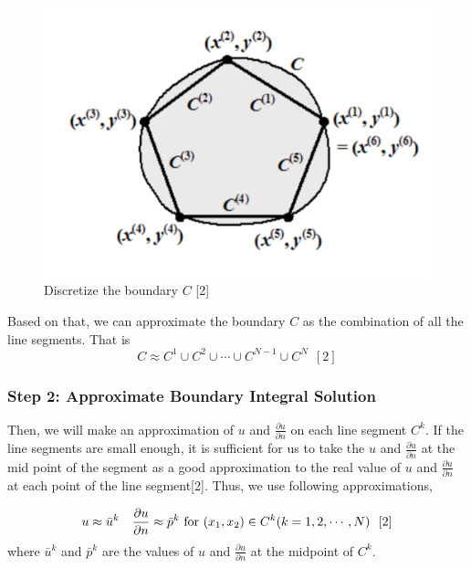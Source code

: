 \documentclass[a4paper,12pt]{article}
\begin{document}
\begin{figure}[H]
 \centering
 \includegraphics[scale=0.5]{2.png}
 \caption{Discretize the boundary $C$ [2]}
 \end{figure}
  
Based on that, we can approximate the boundary $C$ as the combination of all the line segments. That is
\begin{equation}
C \approx C^1 \cup C^2 \cup \cdots \cup C^{N-1} \cup C^N \ \ [2]
\end{equation}

\subsubsection*{Step 2: Approximate Boundary Integral Solution}

\par Then, we will make an approximation of $u$ and $\frac{\partial u}{\partial n}$ on each line segment $C^k$. If the line segments are small enough, it is sufficient for us to take the $u$ and $\frac{\partial u}{\partial n}$ at the mid point of the segment as a good approximation to the real value of $u$ and $\frac{\partial u}{\partial n}$ at each point of the line segment[2]. Thus, we use following approximations,

\begin{equation}
\begin{aligned}
&u \approx \bar{u}^k & \frac{\partial u}{\partial n} \approx \bar{p}^k \ {\rm for }\ (x_1,x_2) \in C^k (k = 1,2,\cdots, N) \ \ [2]
\end{aligned}
\end{equation}
where $\bar{u}^k$ and $\bar{p}^k$ are the values of $u$ and $\frac{\partial u}{\partial n}$ at the midpoint of $C^k$. 
\end{document}
